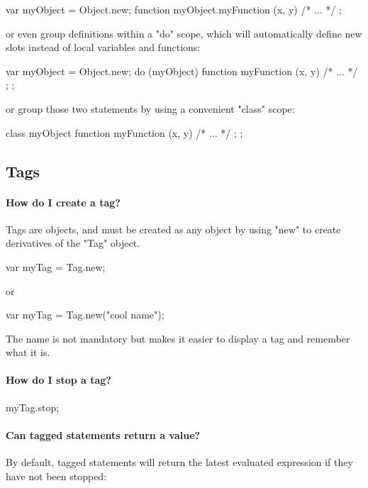 \begin{urbifixme}
var myObject = Object.new;
function myObject.myFunction (x, y) { /* ... */ };
\end{urbifixme}

or even group definitions within a "do" scope, which will automatically
define new slots instead of local variables and functions:

\begin{urbifixme}
var myObject = Object.new;
do (myObject) {
  function myFunction (x, y) { /* ... */ };
};
\end{urbifixme}

or group those two statements by using a convenient "class" scope:

\begin{urbifixme}
class myObject {
  function myFunction (x, y) { /* ... */ };
};
\end{urbifixme}

\subsection{Tags}

\paragraph{How do I create a tag?}


Tags are objects, and must be created as any object by using "new" to create
derivatives of the "Tag" object.

\begin{urbifixme}
var myTag = Tag.new;
\end{urbifixme}

or

\begin{urbifixme}
var myTag = Tag.new("cool name");
\end{urbifixme}

The name is not mandatory but makes it easier to display a tag and remember
what it is.

\paragraph{How do I stop a tag?}
\begin{urbifixme}
myTag.stop;
\end{urbifixme}

\paragraph{Can tagged statements return a value?}
By default, tagged statements will return the latest evaluated expression if
they have not been stopped:

